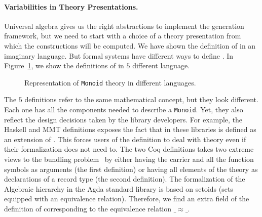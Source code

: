 \paragraph{Variabilities in Theory Presentations.}
Universal algebra gives us the right abstractions to implement the generation framework, but we need to start with a choice of a theory presentation from which the constructions will be computed. We have shown the definition of  in an imaginary language. But formal systems have different ways to define . 
In Figure~\ref{fig:mon-diff-lang}, we show the definitions of  in $5$ different language. 
\begin{figure}
    
    \caption{Representation of \lstinline|Monoid| theory in different languages.}
    \label{fig:mon-diff-lang}
\end{figure}
The $5$ definitions refer to the same mathematical concept, but they look different. 
Each one has all the components needed to describe a \verb|Monoid|. Yet, they also reflect the design decisions taken by the library developers. 
For example, the Haskell and MMT definitions exposes the fact that \monoid in these libraries is defined as an extension of \semigroup. This forces users of the definition to deal with \semigroup theory even if their formalization does not need to. 
The two Coq definitions takes two extreme views to the bundling problem~\cite{lean2019,alhassy2019,spitters2011type} by either having the carrier and all the function symbols as arguments (the first definition) or having all elements of the theory as declarations of a record type (the second definition). 
The formalization of the Algebraic hierarchy in the Agda standard library is based on setoids (sets equipped with an equivalence relation). Therefore, we find an extra field of the definition of \monoid corresponding to the equivalence relation $\_\approx\_$. 

